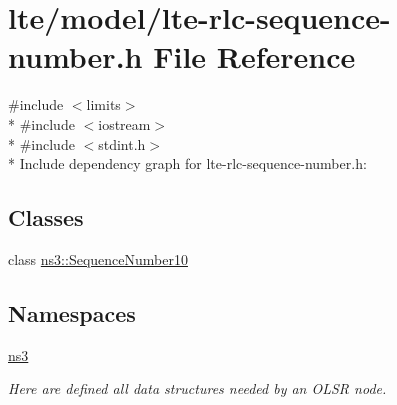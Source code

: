 \hypertarget{lte-rlc-sequence-number_8h}{}\section{lte/model/lte-\/rlc-\/sequence-\/number.h File Reference}
\label{lte-rlc-sequence-number_8h}
{\ttfamily \#include $<$limits$>$}\\*
{\ttfamily \#include $<$iostream$>$}\\*
{\ttfamily \#include $<$stdint.\+h$>$}\\*
Include dependency graph for lte-\/rlc-\/sequence-\/number.h\+:
\subsection*{Classes}
\begin{DoxyCompactItemize}
\item 
class \hyperlink{classns3_1_1SequenceNumber10}{ns3\+::\+Sequence\+Number10}
\end{DoxyCompactItemize}
\subsection*{Namespaces}
\begin{DoxyCompactItemize}
\item 
 \hyperlink{namespacens3}{ns3}
\begin{DoxyCompactList}\small\item\em Here are defined all data structures needed by an O\+L\+SR node. \end{DoxyCompactList}\end{DoxyCompactItemize}
